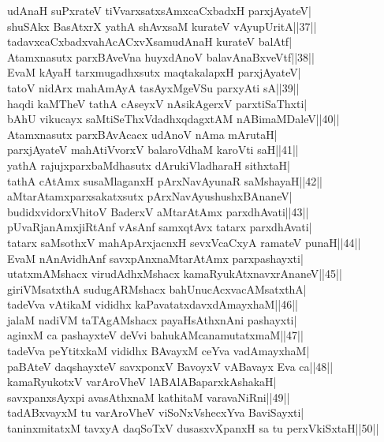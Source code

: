 \documentclass{article}
\begin{document}
udAnaH suPxrateV tiVvarxsatxsAmxcaCxbadxH parxjAyateV|\\
shuSAkx BasAtxrX yathA shAvxsaM kurateV vAyupUritA||37||\\
tadavxcaCxbadxvahAcACxvXsamudAnaH kurateV balAtf|\\
Atamxnasutx parxBAveVna huyxdAnoV balavAnaBxveVtf||38||\\
EvaM kAyaH tarxmugadhxsutx maqtakalapxH parxjAyateV|\\
tatoV nidArx mahAmAyA tasAyxMgeVSu parxyAti sA||39||\\
haqdi kaMTheV  tathA cAseyxV nAsikAgerxV parxtiSaThxti|\\
bAhU vikucayx saMtiSeThxVdadhxqdagxtAM  nABimaMDaleV||40||\\
Atamxnasutx parxBAvAcacx udAnoV nAma mArutaH|\\
parxjAyateV mahAtiVvorxV balaroVdhaM karoVti saH||41||\\
yathA rajujxparxbaMdhasutx dArukiVladharaH sithxtaH|\\
tathA cAtAmx susaMlaganxH pArxNavAyunaR saMshayaH||42||\\
aMtarAtamxparxsakatxsutx pArxNavAyushushxBAnaneV|\\
budidxvidorxVhitoV BaderxV aMtarAtAmx parxdhAvati||43||\\
pUvaRjanAmxjiRtAnf vAsAnf samxqtAvx tatarx parxdhAvati|\\
tatarx saMsothxV mahApArxjacnxH sevxVcaCxyA ramateV punaH||44||\\
EvaM nAnAvidhAnf savxpAnxnaMtarAtAmx parxpashayxti|\\
utatxmAMshacx virudAdhxMshacx kamaRyukAtxnavxrAnaneV||45||\\
giriVMsatxthA sudugARMshacx bahUnucAcxvacAMsatxthA|\\
tadeVva vAtikaM vididhx kaPavatatxdavxdAmayxhaM||46||\\
jalaM nadiVM taTAgAMshacx payaHsAthxnAni pashayxti|\\
aginxM ca pashayxteV deVvi bahukAMcanamutatxmaM||47||\\
tadeVva peYtitxkaM vididhx BAvayxM ceYva vadAmayxhaM|\\
paBAteV daqshayxteV savxponxV BavoyxV vABavayx Eva ca||48||\\
kamaRyukotxV varAroVheV lABAlABaparxkAshakaH|\\
savxpanxsAyxpi avasAthxnaM kathitaM varavaNiRni||49||\\
tadABxvayxM tu varAroVheV viSoNxVshecxYva BaviSayxti|\\
taninxmitatxM tavxyA daqSoTxV dusasxvXpanxH sa tu perxVkiSxtaH||50||\\
\end{document}
